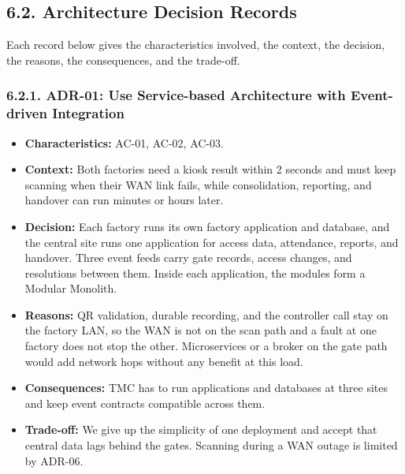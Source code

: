 \subsection*{6.2. Architecture Decision Records}

{}

Each record below gives the characteristics involved, the context, the decision, the reasons, the consequences, and the trade-off.

\subsubsection*{6.2.1. ADR-01: Use Service-based Architecture with Event-driven Integration}

{}

\begin{itemize}[leftmargin=36pt, itemsep=2pt, topsep=4pt, parsep=2pt]
  \item \textbf{Characteristics:} AC-01, AC-02, AC-03.
  \item \textbf{Context:} Both factories need a kiosk result within 2 seconds and must keep scanning when their WAN link fails, while consolidation, reporting, and handover can run minutes or hours later.
  \item \textbf{Decision:} Each factory runs its own factory application and database, and the central site runs one application for access data, attendance, reports, and handover. Three event feeds carry gate records, access changes, and resolutions between them. Inside each application, the modules form a Modular Monolith.
  \item \textbf{Reasons:} QR validation, durable recording, and the controller call stay on the factory LAN, so the WAN is not on the scan path and a fault at one factory does not stop the other. Microservices or a broker on the gate path would add network hops without any benefit at this load.
  \item \textbf{Consequences:} TMC has to run applications and databases at three sites and keep event contracts compatible across them.
  \item \textbf{Trade-off:} We give up the simplicity of one deployment and accept that central data lags behind the gates. Scanning during a WAN outage is limited by ADR-06.
\end{itemize}

